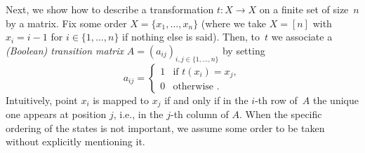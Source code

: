 Next, we show how to describe a transformation
$t \colon X \to X$ on a finite set of size~$n$
by a matrix. 
Fix some order $X = \{x_1, \ldots, x_n\}$ (where we take $X = [n]$ with $x_i = i - 1$ for $i \in \{1,\ldots,n\}$ if nothing else is said).
Then, to~$t$ we associate a
\emph{(Boolean) transition matrix}
$A = (a_{ij})_{i,j \in \{1,\ldots,n\}}$ by setting
\[
a_{ij} = \begin{cases}
	1 & \text{if } t(x_i) = x_j, \\
	0 & \text{otherwise }.
\end{cases} 
\]
Intuitively, point $x_i$ is mapped to $x_j$ 
if and only if in the $i$-th row of~$A$
the unique one appears at position $j$, i.e., in the $j$-th column of $A$.
When the specific ordering of the states is not important, we
assume some order to be taken without explicitly mentioning it.
